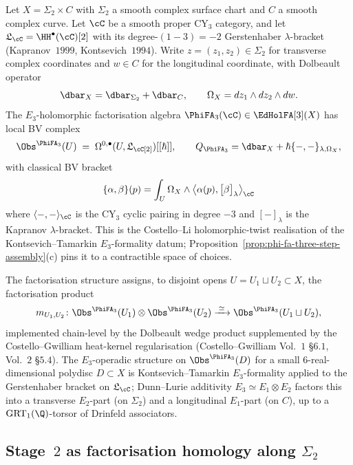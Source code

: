 \begin{construction}
\label{wn:cons:agent3-dolbeault-bv-model}
Let $X=\Sigma_2\times C$ with $\Sigma_2$ a smooth complex surface chart and $C$ a smooth complex curve. Let $\cC$ be a smooth proper CY$_3$ category, and let $\mathfrak{L}_\cC=\HH^\bullet(\cC)[2]$ with its degree-$(1-3)=-2$ Gerstenhaber $\lambda$-bracket (Kapranov~$1999$, Kontsevich~$1994$). Write $z=(z_1,z_2)\in\Sigma_2$ for transverse complex coordinates and $w\in C$ for the longitudinal coordinate, with Dolbeault operator
\[
 \dbar_X=\dbar_{\Sigma_2}+\dbar_C,
 \qquad
 \Omega_X=dz_1\wedge dz_2\wedge dw.
\]
The $E_3$-holomorphic factorisation algebra $\PhiFA_3(\cC)\in\EdHolFA[3](X)$ has local BV complex
\[
 \Obs^{\PhiFA_3}(U)\;=\;
 \Omega^{0,\bullet}(U,\mathfrak{L}_\cC[2])[[\hbar]],
 \qquad
 Q_{\PhiFA_3}=\dbar_X+\hbar\{-,-\}_{\lambda,\Omega_X},
\]
with classical BV bracket
\[
 \{\alpha,\beta\}(p)=
 \int_{U}\Omega_X\wedge
 \bigl\langle\alpha(p),\bigl[\beta\bigr]_\lambda\bigr\rangle_{\cC}
\]
where $\langle-,-\rangle_\cC$ is the CY$_3$ cyclic pairing in degree $-3$ and $[-]_\lambda$ is the Kapranov $\lambda$-bracket. This is the Costello--Li holomorphic-twist realisation of the Kontsevich--Tamarkin $E_3$-formality datum; Proposition~\ref{prop:phi-fa-three-step-assembly}(c) pins it to a contractible space of choices.
\end{construction}

The factorisation structure assigns, to disjoint opens $U=U_1\sqcup U_2\subset X$, the factorisation product
\[
 m_{U_1,U_2}\colon
 \Obs^{\PhiFA_3}(U_1)\otimes
 \Obs^{\PhiFA_3}(U_2)
 \xrightarrow{\;\simeq\;}
 \Obs^{\PhiFA_3}(U_1\sqcup U_2),
\]
implemented chain-level by the Dolbeault wedge product supplemented by the Costello--Gwilliam heat-kernel regularisation (Costello--Gwilliam Vol.~$1$ \S$6.1$, Vol.~$2$ \S$5.4$). The $E_3$-operadic structure on $\Obs^{\PhiFA_3}(D)$ for a small $6$-real-dimensional polydisc $D\subset X$ is Kontsevich--Tamarkin $E_3$-formality applied to the Gerstenhaber bracket on $\mathfrak{L}_\cC$; Dunn--Lurie additivity $E_3\simeq E_1\otimes E_2$ factors this into a transverse $E_2$-part (on $\Sigma_2$) and a longitudinal $E_1$-part (on $C$), up to a $\mathrm{GRT}_1(\Q)$-torsor of Drinfeld associators.

\subsection{Stage~\texorpdfstring{$2$}{2} as factorisation homology along \texorpdfstring{$\Sigma_2$}{Sigma-2}}
\label{wn:subsec:agent3-factorisation-homology}

